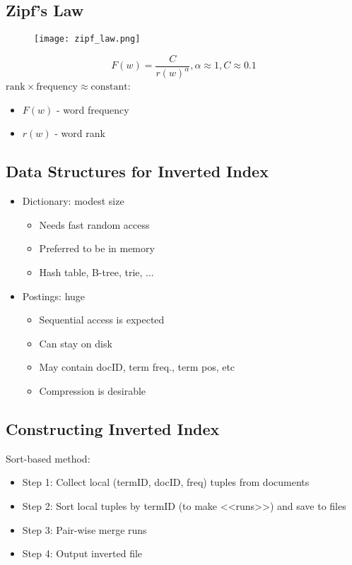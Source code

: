 \subsection{Zipf’s Law}
\begin{figure}[H]
    \centering
    \texttt{[image: zipf\_law.png]}
\end{figure}

\begin{equation*}
F(w) = \frac{C}{r(w)^\alpha}, \alpha \approx 1, C \approx 0.1
\end{equation*}
$\textrm{rank} \times \textrm{frequency} \approx \textrm{constant}$:
\begin{itemize}
\item $F(w)$ - word frequency
\item $r(w)$ - word rank
\end{itemize}


\subsection{Data Structures for Inverted Index}
\begin{itemize}
\item Dictionary: modest size
\begin{itemize}
\item Needs fast random access 
\item Preferred to be in memory 
\item Hash table, B-tree, trie, ...
\end{itemize}

\item Postings: huge
\begin{itemize}
\item Sequential access is expected
\item Can stay on disk
\item May contain docID, term freq., term pos, etc 
\item Compression is desirable
\end{itemize}
\end{itemize}

\subsection{Constructing Inverted Index}

Sort-based method:
\begin{itemize}
\item Step 1: Collect local (termID, docID, freq) tuples from documents
\item Step 2: Sort local tuples by termID (to make <<runs>>) and save to files
\item Step 3: Pair-wise merge runs
\item Step 4: Output inverted file
\end{itemize}


